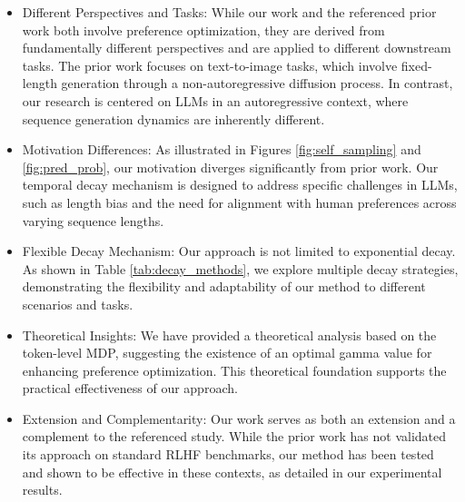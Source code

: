 \begin{itemize}
    \item Different Perspectives and Tasks: While our work and the referenced prior work both involve preference optimization, they are derived from fundamentally different perspectives and are applied to different downstream tasks. The prior work focuses on text-to-image tasks, which involve fixed-length generation through a non-autoregressive diffusion process. In contrast, our research is centered on LLMs in an autoregressive context, where sequence generation dynamics are inherently different.
    \item Motivation Differences: As illustrated in Figures \ref{fig:self_sampling} and \ref{fig:pred_prob}, our motivation diverges significantly from prior work. Our temporal decay mechanism is designed to address specific challenges in LLMs, such as length bias and the need for alignment with human preferences across varying sequence lengths.
    \item Flexible Decay Mechanism: Our approach is not limited to exponential decay. As shown in Table \ref{tab:decay_methods}, we explore multiple decay strategies, demonstrating the flexibility and adaptability of our method to different scenarios and tasks.
    \item Theoretical Insights: We have provided a theoretical analysis based on the token-level MDP, suggesting the existence of an optimal gamma value for enhancing preference optimization. This theoretical foundation supports the practical effectiveness of our approach.
    \item Extension and Complementarity: Our work serves as both an extension and a complement to the referenced study. While the prior work has not validated its approach on standard RLHF benchmarks, our method has been tested and shown to be effective in these contexts, as detailed in our experimental results.
\end{itemize}
